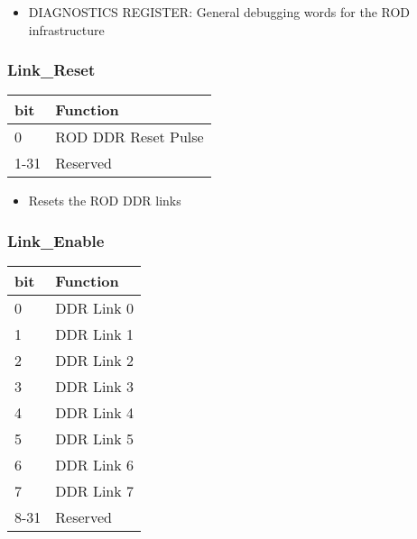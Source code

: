 \begin{itemize}
\item DIAGNOSTICS REGISTER: General debugging words for the ROD infrastructure
\end{itemize}




\subsubsection{Link\_Reset}

\begin {table}[H]
\begin{center}
\begin{tabular}{|l|l|}
\hline
\textbf{bit} & \textbf{Function} \\
\hline
0 & ROD DDR Reset Pulse \\
\hline
1-31 & Reserved \\
\hline
\end{tabular}
\end{center}
\end{table}


\begin{itemize}
\item Resets the ROD DDR links
\end{itemize}




\subsubsection{Link\_Enable}

\begin {table}[H]
\begin{center}
\begin{tabular}{|l|l|}
\hline
\textbf{bit} & \textbf{Function} \\
\hline
0 & DDR Link 0 \\
\hline
1 & DDR Link 1 \\
\hline
2 & DDR Link 2 \\
\hline
3 & DDR Link 3 \\
\hline
4 & DDR Link 4 \\
\hline
5 & DDR Link 5 \\
\hline
6 & DDR Link 6 \\
\hline
7 & DDR Link 7 \\
\hline
8-31 & Reserved \\
\hline
\end{tabular}
\end{center}
\end{table}


